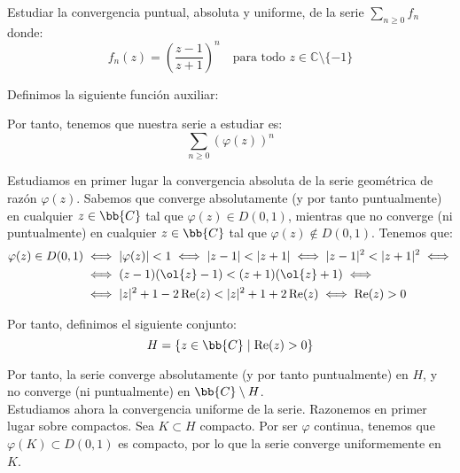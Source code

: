 \begin{ejercicio}
    Estudiar la convergencia puntual, absoluta y uniforme, de la serie $\displaystyle \sum_{n \geq 0} f_n$ donde:
    \[
        f_n(z) = \left(\dfrac{z-1}{z+1}\right)^n \quad \text{para todo } z \in \mathbb{C}\setminus\{-1\}
    \]

        
        Definimos la siguiente función auxiliar:

        Por tanto, tenemos que nuestra serie a estudiar es:
        \begin{equation*}
            \sum_{n \geq 0} \left(\varphi(z)\right)^n
        \end{equation*}

        Estudiamos en primer lugar la convergencia absoluta de la serie geométrica de razón $\varphi(z)$. Sabemos que converge absolutamente (y por tanto puntualmente) en cualquier $z\in \bb{C}$ tal que $\varphi(z)\in D(0,1)$, mientras que no converge (ni puntualmente) en cualquier $z\in \bb{C}$ tal que $\varphi(z)\notin D(0,1)$. Tenemos que:
        \begin{align*}
            \varphi(z)\in D(0,1) &\iff |\varphi(z)|<1
            \iff |z-1|<|z+1|\iff |z-1|^2<|z+1|^2\iff\\&\iff (z-1)(\ol{z}-1)<(z+1)(\ol{z}+1)
            \iff\\&\iff |z|^2+1 -2\Re(z)<|z|^2+1+2\Re(z)\iff \Re(z)>0
        \end{align*}

        Por tanto, definimos el siguiente conjunto:
        \begin{equation*}
            H = \{z\in \bb{C}\mid \Re(z)>0\}
        \end{equation*}

        Por tanto, la serie converge absolutamente (y por tanto puntualmente) en $H$, y no converge (ni puntualmente) en $\bb{C}\setminus H$.\\

        Estudiamos ahora la convergencia uniforme de la serie. Razonemos en primer lugar sobre compactos. Sea $K\subset H$ compacto. Por ser $\varphi$ continua, tenemos que $\varphi(K)\subset D(0,1)$ es compacto, por lo que la serie converge uniformemente en $K$.\\
        

\end{ejercicio}
